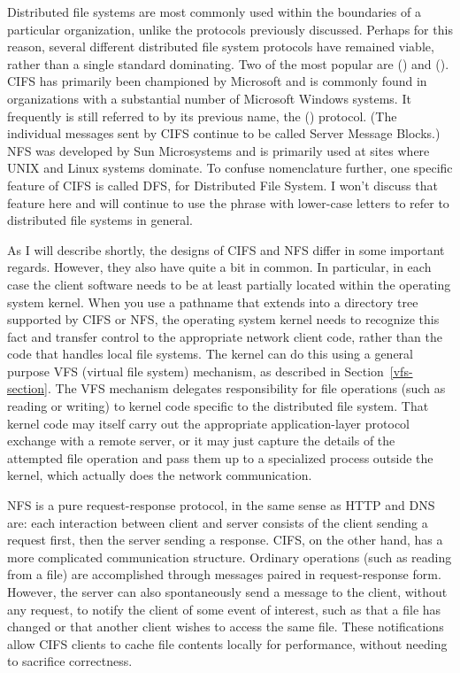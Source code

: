 Distributed file systems are most commonly used within the boundaries
of a particular organization, unlike the protocols previously
discussed.  Perhaps for this reason, several different distributed
file system protocols have remained viable, rather than a single
standard dominating.  Two of the most popular are 
() and 
().  CIFS has primarily been championed by
Microsoft and is commonly found in organizations with a substantial
number of Microsoft Windows systems.  It frequently is still referred
to by its previous name, the  () protocol.  (The individual messages sent by CIFS continue to be
called Server Message Blocks.)  NFS was developed by Sun Microsystems
and is primarily used at sites where UNIX and Linux systems dominate.
To confuse nomenclature further, one specific feature of CIFS is
called DFS, for Distributed File System.  I won't discuss that feature
here and will continue to use the phrase with lower-case letters to
refer to distributed file systems in general.

As I will describe shortly, the designs of CIFS and NFS differ in some
important regards.  However, they also have quite a bit in common.  In
particular, in each case the client software needs to be at least
partially located within the operating system kernel.  When you use a
pathname that extends into a directory tree supported by CIFS or NFS,
the operating system kernel needs to recognize this fact and transfer
control to the appropriate network client code, rather than the code
that handles local file systems. The kernel can do this using a general
purpose VFS (virtual file system) mechanism, as described in
Section~\ref{vfs-section}.  The VFS mechanism delegates responsibility
for file operations (such as reading or writing) to kernel code
specific to the distributed file system.  That kernel code may itself
carry out the appropriate application-layer protocol exchange with a
remote server, or it may just capture the details of the attempted
file operation and pass them up to a specialized process outside the
kernel, which actually does the network communication.

NFS is a pure request-response protocol, in the same sense as HTTP and
DNS are: each interaction between client and server consists of the
client sending a request first, then the server sending a response.
CIFS, on the other hand, has a more complicated communication
structure. Ordinary operations (such as reading from a file) are
accomplished through messages paired in request-response form.
However, the server can also spontaneously send a message to the
client, without any request, to notify the client of some event of
interest, such as that a file has changed or that another client
wishes to access the same file.  These notifications allow CIFS
clients to cache file contents locally for performance, without
needing to sacrifice correctness.


